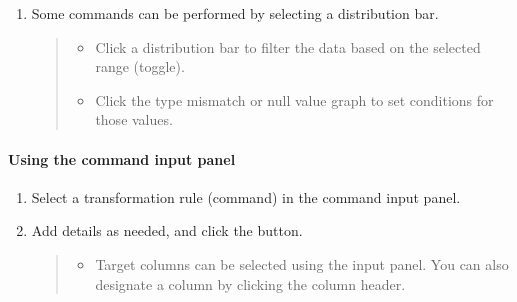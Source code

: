 \documentclass[letterpaper,10pt,english]{sphinxmanual}
\begin{document}
\begin{enumerate}
\begin{quote}
\begin{figure}[H]
\centering

\noindent{}
\end{figure}
\end{quote}

\item {} 
Some commands can be performed by selecting a distribution bar.
\begin{quote}
\begin{itemize}
\item {} 
Click a distribution bar to filter the data based on the selected range (toggle).

\item {} 
Click the type mismatch or null value graph to set conditions for those values.

\end{itemize}

\begin{figure}[H]
\centering

\noindent{}
\end{figure}
\end{quote}

\end{enumerate}


\paragraph{Using the command input panel}
\label{\detokenize{discovery/part07/edit_rules:id4}}\begin{enumerate}
\def\theenumi{\arabic{enumi}}
\def\labelenumi{\theenumi .}
\makeatletter\def\p@enumii{\p@enumi \theenumi .}\makeatother
\item {} 
Select a transformation rule (command) in the command input panel.
\begin{quote}

\begin{figure}[H]
\centering

\noindent{}
\end{figure}
\end{quote}

\item {} 
Add details as needed, and click the  button.
\begin{quote}
\begin{itemize}
\item {} 
Target columns can be selected using the input panel. You can also designate a column by clicking the column header.

\end{itemize}

\begin{figure}[H]
\centering

\noindent{}
\end{figure}
\end{quote}

\end{enumerate}
\end{document}
